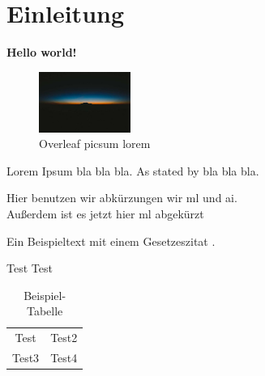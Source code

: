 \documentclass[../main.tex]{subfiles}
\begin{document}
\section{Einleitung}

\textbf{Hello world!} %

\begin{figure}[h]
    \centering
    \includegraphics[width=3cm]{images/picsum lorem.jpg} %
    \caption{Overleaf picsum lorem} %
    \label{fig:picsum_lorem} %
\end{figure}

Lorem Ipsum bla\autocite[10]{smith2018} bla bla. As stated by bla bla bla. %

Hier benutzen wir abkürzungen wir \gls{ml} und \gls{ai}.\\ %
Außerdem ist es jetzt hier \gls{ml} abgekürzt

Ein Beispieltext mit einem Gesetzeszitat . %

Test Test \autocite[15-27]{johnson2020} %

\medskip

\begin{table}[h]
    \centering
    \begin{tabular}{cc}
        Test & Test2\\
        Test3 & Test4\\
    \end{tabular}
    \caption{Beispiel-Tabelle} %
    \label{tab:example_table} %
\end{table}
\end{document}
